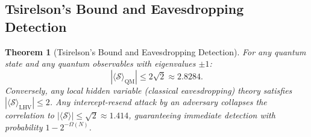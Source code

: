 \documentclass{ieeeaccess}
\newcommand{\calS}{\mathcal{S}}
\newtheorem{theorem}{Theorem}
\begin{document}
\subsection{Tsirelson's Bound and Eavesdropping Detection}
\begin{theorem}[Tsirelson's Bound and Eavesdropping Detection]
\label{thm:L7-tsirelson}
For any quantum state and any quantum observables with eigenvalues $\pm 1$:
\begin{equation}
  |\langle \calS \rangle_{\mathrm{QM}}| \leq 2\sqrt{2} \approx 2.8284.
\end{equation}
Conversely, any local hidden variable (classical eavesdropping) theory satisfies $|\langle \calS \rangle_{\mathrm{LHV}}| \leq 2$.
Any intercept-resend attack by an adversary collapses the correlation to $|\langle \calS \rangle| \leq \sqrt{2} \approx 1.414$, guaranteeing immediate detection with probability $1 - 2^{-\Omega(N)}$.
\end{theorem}
\end{document}

